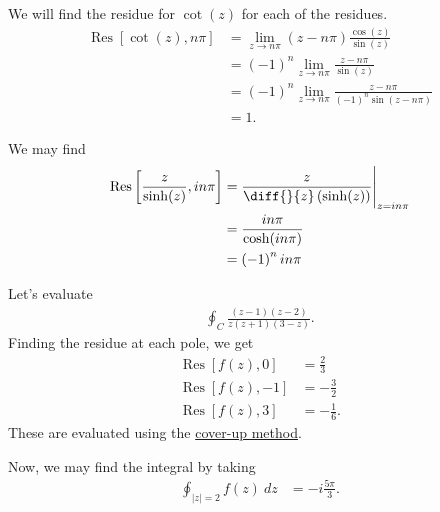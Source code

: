 \documentclass[10pt]{mypackage}
\DeclareMathOperator{\Res}{Res}
\DeclareMathOperator{\res}{Res}
\begin{document}
\begin{example}
  We will find the residue for $\cot(z)$ for each of the residues.
  \begin{align*}
    \Res\left[ \cot(z), n\pi\right] &= \lim_{z\rightarrow n\pi} \left( z-n\pi \right)\frac{\cos(z)}{\sin(z)}\\
                                    &= \left( -1 \right)^{n} \lim_{z\rightarrow n\pi} \frac{z-n\pi}{\sin(z)}\\
                                    &= \left( -1 \right)^{n} \lim_{z\rightarrow n\pi}\frac{z-n\pi}{\left( -1 \right)^{n}\sin\left( z-n\pi \right)}\\
                                    &= 1.
  \end{align*}
\end{example}
\begin{example}
  We may find
  \begin{align*}
    \Res\left[ \frac{z}{\sinh(z)},in\pi \right] &= \frac{z}{\diff{}{z}\left( \sinh(z) \right)}\Biggr\vert_{z=in\pi}\\
                                                &= \frac{in\pi}{\cosh(in\pi)}\\
                                                &= \left( -1 \right)^nin\pi
  \end{align*}
\end{example}
\begin{example}
  Let's evaluate 
  \begin{align*}
    \oint_{C} \frac{(z-1)\left( z-2 \right)}{z\left( z+1 \right)\left( 3-z \right)}.
  \end{align*}
  Finding the residue at each pole, we get
  \begin{align*}
    \res\left[ f(z),0 \right] &= \frac{2}{3}\\
    \res\left[ f(z),-1 \right] &= -\frac{3}{2}\\
    \res\left[ f(z),3 \right] &= -\frac{1}{6}.
  \end{align*}
  These are evaluated using the \href{https://en.wikipedia.org/wiki/Heaviside_cover-up_method}{cover-up method}.\newline

  Now, we may find the integral by taking
  \begin{align*}
    \oint_{\left\vert z \right\vert = 2}f(z)\:dz &= -i\frac{5\pi}{3}.
  \end{align*}
\end{example}
\end{document}
